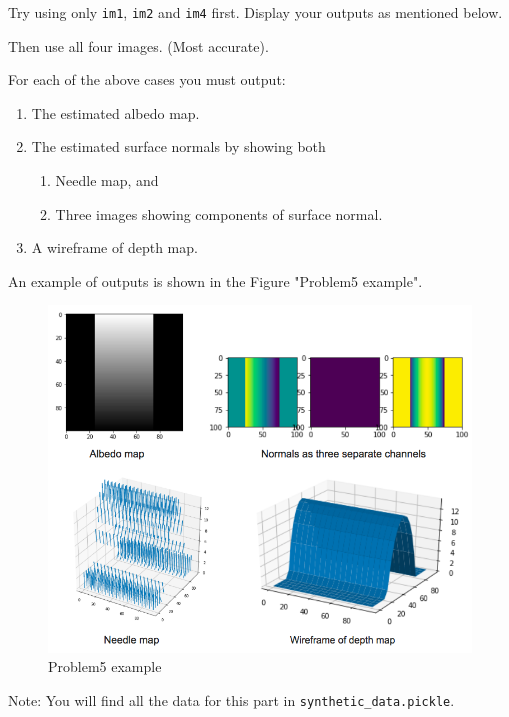 \documentclass[11pt]{article}
\makeatletter
\def\maxwidth{\ifdim\Gin@nat@width>\linewidth\linewidth
    \else\Gin@nat@width\fi}
\let\Oldincludegraphics\includegraphics
\renewcommand{\includegraphics}[1]{\Oldincludegraphics[width=.8\maxwidth]{#1}}
\providecommand{\tightlist}{%
      \setlength{\itemsep}{0pt}\setlength{\parskip}{0pt}}
\makeatother
\begin{document}
Try using only \texttt{im1}, \texttt{im2} and \texttt{im4} first.
Display your outputs as mentioned below.

Then use all four images. (Most accurate).

For each of the above cases you must output:

\begin{enumerate}
\def\labelenumi{\arabic{enumi}.}
\item
  The estimated albedo map.
\item
  The estimated surface normals by showing both

  \begin{enumerate}
  \def\labelenumii{\arabic{enumii}.}
  \tightlist
  \item
    Needle map, and
  \item
    Three images showing components of surface normal.
  \end{enumerate}
\item
  A wireframe of depth map.
\end{enumerate}

An example of outputs is shown in the Figure "Problem5 example".

\begin{figure}
\centering
\includegraphics{Problem5 example.png}
\caption{Problem5 example}
\end{figure}

Note: You will find all the data for this part in
\texttt{synthetic\_data.pickle}.
\end{document}
